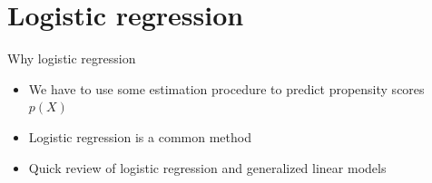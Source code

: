 \documentclass[compress, 8pt]{beamer}
\begin{document}







\section[Logit models]{Logistic regression}
\miniframesoff
\begin{frame}
    \tableofcontents[currentsection]
\end{frame}
\miniframeson

\begin{frame}{Why logistic regression}

\begin{itemize}
    \item We have to use some estimation procedure to predict propensity scores $p(X)$
    \item Logistic regression is a common method
    \item Quick review of logistic regression and generalized linear models
\end{itemize}

\end{frame}
\end{document}
